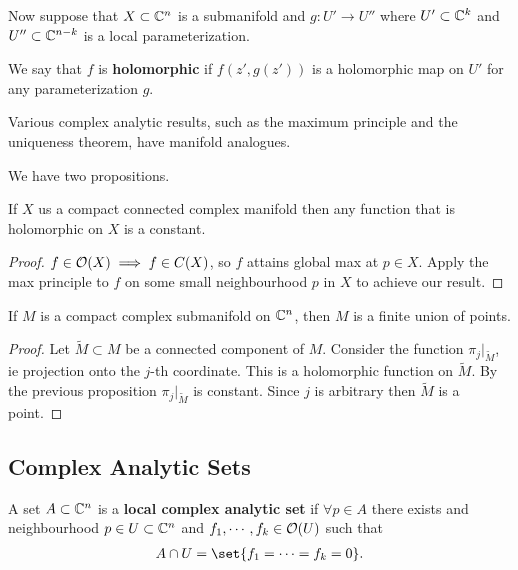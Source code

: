 Now suppose that $X \subset \mathbb{C}^n$ is a submanifold and $g: U' \to U''$ where $U' \subset \mathbb{C}^k$ and $U'' \subset \mathbb{C}^{n-k}$ is a local parameterization.

\begin{definition}
    We say that $f$ is \textbf{holomorphic} if $f(z' , g(z'))$ is a holomorphic map on $U'$ for any parameterization $g$.
\end{definition}

\begin{remark}
    Various complex analytic results, such as the maximum principle and the uniqueness theorem, have manifold analogues.
\end{remark}

We have two propositions.

\begin{proposition}
    If $X$ us a compact connected complex manifold then any function that is holomorphic on $X$ is a constant.
\end{proposition}

\begin{proof}
    $f \in \mathcal{O} (X) \implies f \in C(X)$, so $f$ attains global max at $p \in X$. Apply the max principle to $f$ on some small neighbourhood $p$ in $X$ to achieve our result.
\end{proof}

\begin{proposition}
    If $M$ is a compact complex submanifold on $\mathbb{C}^n$, then $M$ is a finite union of points.
\end{proposition}

\begin{proof}
    Let $\tilde{M} \subset M$ be a connected component of $M$. Consider the function $\pi_j |_{\tilde{M}}$, ie projection onto the $j$-th coordinate. This is a holomorphic function on $\tilde{M}$. By the previous proposition $\pi_j |_{\tilde{M}}$ is constant. Since $j$ is arbitrary then $\tilde{M}$ is a point.
\end{proof}

\subsection{Complex Analytic Sets}

\begin{definition}
    A set $A \subset \mathbb{C}^n$ is a \textbf{local complex analytic set} if $\forall p \in A$ there exists and neighbourhood $p \in U \subset \mathbb{C}^n$ and $f_1 , \cdots, f_k \in \mathcal{O}(U)$ such that
    \begin{align*}
        A \cap U = \set{ f_1 = \cdots = f_k = 0}.
    \end{align*}
\end{definition}

